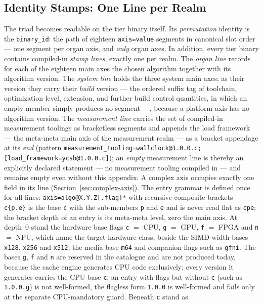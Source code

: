 \begin{nurlang}
\subsection{Identity Stamps: One Line per Realm}\label{sec:stamp-model}
The triad becomes readable on the tier binary itself. Its \emph{permutation} identity is the
\texttt{binary\_id}: the path of eighteen \texttt{axis=value} segments in canonical
slot order --- one segment per organ axis, and \emph{only} organ axes. In addition, every
tier binary contains compiled-in \emph{stamp lines}, exactly one per realm. The \emph{organ line}
records for each of the eighteen main axes the chosen algorithm together with its algorithm version.
The \emph{system line} holds the three system main axes; as their version they carry their
\emph{build} version --- the ordered suffix tag of toolchain, optimization level,
extension, and further build control quantities, in which an empty member simply produces no segment
---, because a platform axis has no algorithm version. The \emph{measurement line} carries the
set of compiled-in measurement toolings as bracketless segments and appends the load framework ---
the meta-meta main axis of the measurement realm --- as a bracket appendage at its \emph{end} (pattern
\texttt{measurement\_tooling=wallclock@1.0.0.c;\allowbreak{}[load\_framework=ycsb@1.0.0.c]}); an
\emph{empty} measurement line is thereby an explicitly declared statement --- no measurement tooling compiled in --- and
remains empty even without this appendix. A
complex axis occupies exactly one field in its line (Section~\ref{sec:complex-axis}). The
entry grammar is defined once for all lines: \texttt{axis=algo@X.Y.Z[.flag]*} with recursive
composite brackets --- \texttt{c\{p.e\}} is the base \texttt{c} with the sub-members \texttt{p} and
\texttt{e} and is never read flat as \texttt{cpe}; the bracket depth of an entry is its
meta-meta level, zero the main axis. At depth~0 stand the hardware base flags \texttt{c} $=$ CPU, \texttt{g} $=$ GPU, \texttt{f} $=$ FPGA and
\texttt{n} $=$ NPU, which name the target hardware class, beside the SIMD-width bases \texttt{x128},
\texttt{x256} and \texttt{x512}, the media base \texttt{m64} and companion flags such as \texttt{gfni}. The
bases \texttt{g}, \texttt{f} and \texttt{n} are reserved in the catalogue and are not produced today, because
the cache engine generates CPU code exclusively; every version it generates carries the CPU base \texttt{c}:
an entry with flags but without \texttt{c} (such as \texttt{1.0.0.g}) is not well-formed, the flagless form
\texttt{1.0.0} is well-formed and fails only at the separate CPU-mandatory guard. Beneath \texttt{c} stand as

\end{nurlang}
